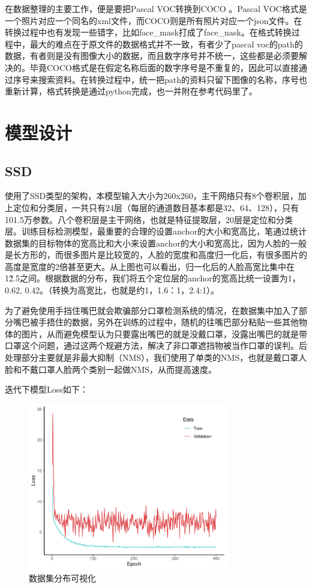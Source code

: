 \documentclass[journal,transmag]{IEEEtran}
\begin{document}
在数据整理的主要工作，便是要把Pascal VOC转换到COCO 。Pascal VOC格式是一个照片对应一个同名的xml文件，而COCO则是所有照片对应一个json文件。在转换过程中也有发现一些错字，比如face\_mask打成了face\_nask。在格式转换过程中，最大的难点在于原文件的数据格式并不一致，有者少了pascal voc的path的数据，有者则是没有图像大小的数据，而且数字序号并不统一，这些都是必须要解决的。毕竟COCO格式是在假定名称后面的数字序号是不重复的，因此可以直接通过序号来搜索资料。在转换过程中，统一把path的资料只留下图像的名称，序号也重新计算，格式转换是通过python完成，也一并附在参考代码里了。

\section{模型设计}
\subsection{SSD}
使用了SSD类型的架构，本模型输入大小为260x260，主干网络只有8个卷积层，加上定位和分类层，一共只有24层（每层的通道数目基本都是32、64、128），只有101.5万参数。八个卷积层是主干网络，也就是特征提取层，20层是定位和分类层。训练目标检测模型，最重要的合理的设置anchor的大小和宽高比，笔通过统计数据集的目标物体的宽高比和大小来设置anchor的大小和宽高比，因为人脸的一般是长方形的，而很多图片是比较宽的，人脸的宽度和高度归一化后，有很多图片的高度是宽度的2倍甚至更大。从上图也可以看出，归一化后的人脸高宽比集中在1\~2.5之间。根据数据的分布，我们将五个定位层的anchor的宽高比统一设置为1，0.62, 0.42。（转换为高宽比，也就是约1，1.6：1，2.4:1）。

为了避免使用手挡住嘴巴就会欺骗部分口罩检测系统的情况，在数据集中加入了部分嘴巴被手捂住的数据，另外在训练的过程中，随机的往嘴巴部分粘贴一些其他物体的图片，从而避免模型认为只要露出嘴巴的就是没戴口罩，没露出嘴巴的就是带口罩这个问题，通过这两个规避方法，解决了非口罩遮挡物被当作口罩的误判。后处理部分主要就是非最大抑制（NMS），我们使用了单类的NMS，也就是戴口罩人脸和不戴口罩人脸两个类别一起做NMS，从而提高速度。

迭代下模型Loss如下：
\begin{figure}[h]
\centering
\includegraphics[width=3.44in]{Ssdloss.pdf}
\caption{数据集分布可视化}
\end{figure}
\end{document}
